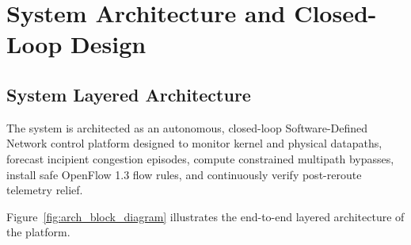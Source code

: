 \chapter{System Architecture and Closed-Loop Design}
\label{ch:arch_design}

\section{System Layered Architecture}
The system is architected as an autonomous, closed-loop Software-Defined Network control platform designed to monitor kernel and physical datapaths, forecast incipient congestion episodes, compute constrained multipath bypasses, install safe OpenFlow 1.3 flow rules, and continuously verify post-reroute telemetry relief.

Figure~\ref{fig:arch_block_diagram} illustrates the end-to-end layered architecture of the platform.

